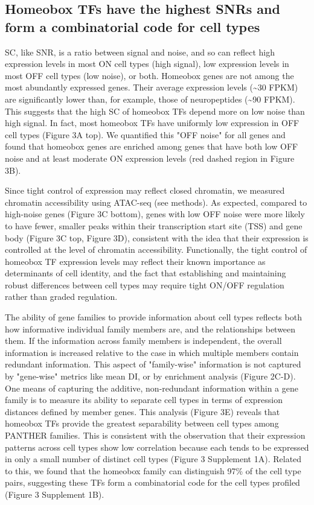 \subsection{Homeobox TFs have the highest SNRs and form a combinatorial code for cell types}
SC, like SNR, is a ratio between signal and noise, and so can reflect high expression levels in most ON cell types (high signal), low expression levels in most OFF cell types (low noise), or both. Homeobox genes are not among the most abundantly expressed genes. Their average expression levels (\sim30 FPKM) are significantly lower than, for example, those of neuropeptides (\sim90 FPKM). This suggests that the high SC of homeobox TFs depend more on low noise than high signal. In fact, most homeobox TFs have uniformly low expression in OFF cell types (Figure 3A top). We quantified this "OFF noise" for all genes and found that homeobox genes are enriched among genes that have both low OFF noise and at least moderate ON expression levels (red dashed region in Figure 3B).

Since tight control of expression may reflect closed chromatin, we measured chromatin accessibility using ATAC-seq (see methods). As expected, compared to high-noise genes (Figure 3C bottom), genes with low OFF noise were more likely to have fewer, smaller peaks within their transcription start site (TSS) and gene body (Figure 3C top, Figure 3D), consistent with the idea that their expression is controlled at the level of chromatin accessibility. Functionally, the tight control of homeobox TF expression levels may reflect their known importance as determinants of cell identity, and the fact that establishing and maintaining robust differences between cell types may require tight ON/OFF regulation rather than graded regulation.

The ability of gene families to provide information about cell types reflects both how informative individual family members are, and the relationships between them. If the information across family members is independent, the overall information is increased relative to the case in which multiple members contain redundant information. This aspect of "family-wise" information is not captured by "gene-wise" metrics like mean DI, or by enrichment analysis (Figure 2C-D). One means of capturing the additive, non-redundant information within a gene family is to measure its ability to separate cell types in terms of expression distances defined by member genes. This analysis (Figure 3E) reveals that homeobox TFs provide the greatest separability between cell types among PANTHER families. This is consistent with the observation that their expression patterns across cell types show low correlation because each tends to be expressed in only a small number of distinct cell types (Figure 3 Supplement 1A). Related to this, we found that the homeobox family can distinguish 97\% of the cell type pairs, suggesting these TFs form a combinatorial code for the cell types profiled (Figure 3 Supplement 1B). 

